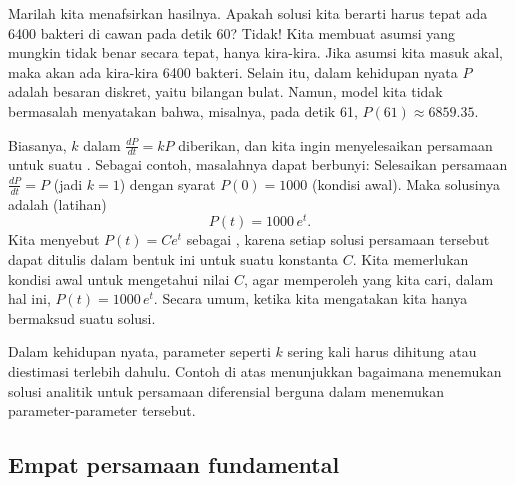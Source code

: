 \begin{example}


Marilah kita menafsirkan hasilnya. Apakah solusi kita berarti
harus tepat ada 6400 bakteri di cawan pada detik 60? Tidak! Kita membuat
asumsi yang mungkin tidak benar secara tepat, hanya kira-kira.
Jika asumsi kita masuk akal,
maka akan ada kira-kira 6400 bakteri.
Selain itu, dalam kehidupan nyata $P$ adalah
besaran diskret, yaitu bilangan bulat. Namun, model kita tidak bermasalah menyatakan
bahwa, misalnya, pada detik 61, $P(61) \approx 6859.35$.
\end{example}

Biasanya, $k$ dalam $\frac{dP}{dt} = kP$ diberikan,
dan kita ingin menyelesaikan
persamaan untuk suatu \emph{}.
Sebagai contoh, masalahnya dapat berbunyi:
Selesaikan persamaan
$\frac{dP}{dt} = P$ (jadi $k=1$)
dengan syarat $P(0) = 1000$ (kondisi awal).
Maka solusinya adalah (latihan)
\begin{equation*}
P(t) = 1000 \, e^t .
\end{equation*}
Kita menyebut $P(t) = C e^t$ sebagai \emph{},
karena setiap solusi
persamaan tersebut dapat ditulis dalam bentuk ini untuk suatu konstanta $C$.
Kita memerlukan kondisi awal untuk mengetahui nilai $C$, agar memperoleh
\emph{} yang kita cari,
dalam hal ini, $P(t) = 1000\, e^t$.
Secara umum, ketika kita mengatakan
 kita hanya bermaksud suatu solusi.

Dalam kehidupan nyata, parameter seperti $k$
sering kali harus dihitung atau diestimasi terlebih dahulu.
Contoh di atas
menunjukkan bagaimana menemukan solusi analitik untuk persamaan diferensial
berguna dalam menemukan parameter-parameter tersebut.

\subsection{Empat persamaan fundamental} \label{subsection:fourfundamental}


